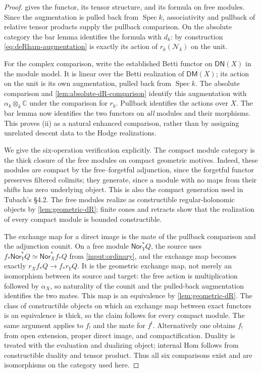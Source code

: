 \documentclass[11pt]{article}
\numberwithin{equation}{section}
\theoremstyle{definition}
\theoremstyle{remark}
\newcommand{\C}{\mathbb C}
\newcommand{\Spec}{\operatorname{Spec}}
\begin{document}
\begin{proof}
 gives the functor, its tensor structure, and
its formula on free modules. Since the augmentation is pulled back from
$\Spec k$, associativity and pullback of relative tensor products supply
the pullback comparison. On the absolute category the bar lemma identifies
the formula with $d_k$: by construction \eqref{eq:deRham-augmentation}
is exactly its action of $r_k(\mathscr N_k)$ on the unit.

For the complex comparison, write the established Betti functor on
$\mathsf{DN}(X)$ in the module model. It is linear over the Betti
realization of $\mathsf{DM}(X)$; its action on the unit is its own
augmentation, pulled back from $\Spec k$. The absolute comparison and
\cref{lem:absolute-dR-comparison} identify this augmentation with
$\alpha_k\otimes_k\C$ under the comparison for $r_k$. Pullback identifies
the actions over $X$. The bar lemma now identifies the two functors on
\emph{all} modules and their morphisms. This proves (ii) as a natural
enhanced comparison, rather than by assigning unrelated descent data to
the Hodge realizations.

We give the six-operation verification explicitly. The compact module
category is the thick closure of the free modules on compact geometric
motives. Indeed, these modules are compact by the free--forgetful
adjunction, since the forgetful functor preserves filtered colimits; they
generate, since a module with no maps from their shifts has zero underlying
object. This is also the compact generation used in Tubach's \S4.2.
The free modules realize as constructible regular-holonomic objects by
\cref{lem:geometric-dR}; finite cones and retracts show that the realization
of every compact module is bounded constructible.

The exchange map for a direct image is the mate of the pullback
comparison and the adjunction counit. On a free module
$\mathsf{Nor}_Y^*Q$, the source uses
$f_*\mathsf{Nor}_Y^*Q\simeq\mathsf{Nor}_X^*f_*Q$ from
\cref{input:ordinary}, and the exchange map becomes exactly
$r_Xf_*Q\to f_*r_YQ$. It is the geometric exchange map, not merely an
isomorphism between its source and target: the free action is multiplication
followed by $\alpha_X$, so naturality of the counit and the pulled-back
augmentation identifies the two mates. This map is an equivalence by
\cref{lem:geometric-dR}. The class of constructible objects on which an
exchange map between exact functors is an equivalence is thick, so the
claim follows for every compact module. The same argument applies to
$f_!$ and the mate for $f^!$. Alternatively one obtains $f_!$ from open
extension, proper direct image, and compactification. Duality is treated
with the evaluation and dualizing object; internal Hom follows from
constructible duality and tensor product. Thus all six comparisons exist
and are isomorphisms on the category used here.


\end{proof}
\end{document}
